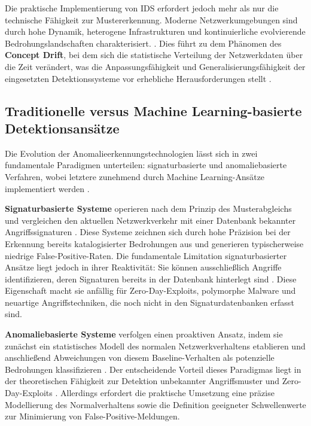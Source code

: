 \documentclass[11pt,a4paper]{article}
\begin{document}
    Die praktische Implementierung von IDS erfordert jedoch mehr als nur die technische Fähigkeit zur Mustererkennung. Moderne Netzwerkumgebungen sind durch hohe Dynamik, heterogene Infrastrukturen und kontinuierliche evolvierende Bedrohungslandschaften charakterisiert. \parencite{Gharib2016}. Dies führt zu dem Phänomen des \textbf{Concept Drift}, bei dem sich die statistische Verteilung der Netzwerkdaten über die Zeit verändert, was die Anpassungsfähigkeit und Generalisierungsfähigkeit der eingesetzten Detektionssysteme vor erhebliche Herausforderungen stellt \parencite{Ring2019}.


    \subsection{Traditionelle versus Machine Learning-basierte Detektionsansätze}

    Die Evolution der Anomalieerkennungstechnologien lässt sich in zwei fundamentale Paradigmen unterteilen: signaturbasierte und anomaliebasierte Verfahren, wobei letztere zunehmend durch  Machine Learning-Ansätze implementiert werden \parencite{Ring2019, Belavagi2016}.

    \textbf{Signaturbasierte Systeme} operieren nach dem Prinzip des Musterabgleichs und vergleichen den aktuellen Netzwerkverkehr mit einer Datenbank bekannter Angriffssignaturen \parencite{Ring2019}. Diese Systeme zeichnen sich durch hohe Präzision bei der Erkennung bereits katalogisierter Bedrohungen aus und generieren typischerweise niedrige False-Positive-Raten. Die fundamentale Limitation signaturbasierter Ansätze liegt jedoch in ihrer Reaktivität: Sie können ausschließlich Angriffe identifizieren, deren Signaturen bereits in der Datenbank hinterlegt sind \parencite{Vinayakumar2019}. Diese Eigenschaft macht sie anfällig für Zero-Day-Exploits, polymorphe Malware und neuartige Angriffstechniken, die noch nicht in den Signaturdatenbanken erfasst sind.

    \textbf{Anomaliebasierte Systeme} verfolgen einen proaktiven Ansatz, indem sie zunächst ein statistisches Modell des normalen Netzwerkverhaltens etablieren und anschließend Abweichungen von diesem Baseline-Verhalten als potenzielle Bedrohungen klassifizieren \parencite{Ring2019}. Der entscheidende Vorteil dieses Paradigmas liegt in der theoretischen Fähigkeit zur Detektion unbekannter Angriffsmuster und Zero-Day-Exploits \parencite{Vinayakumar2019}. Allerdings erfordert die praktische Umsetzung eine präzise Modellierung des Normalverhaltens sowie die Definition geeigneter Schwellenwerte zur Minimierung von False-Positive-Meldungen.
\end{document}
